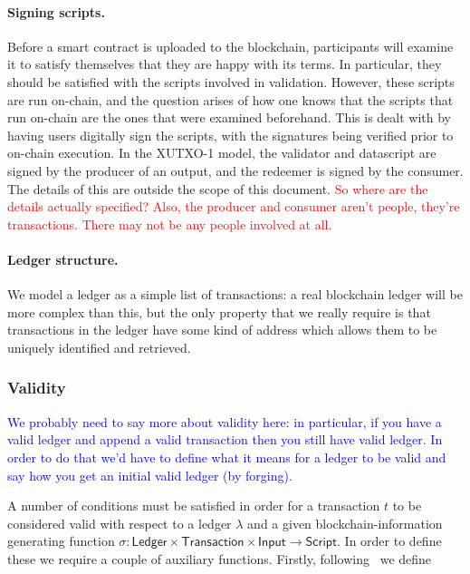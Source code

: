 \documentclass[a4paper]{article}
\newcommand{\red}[1]{\textcolor{red}{#1}}
\newcommand{\blue}[1]{\textcolor{blue}{#1}}
\theoremstyle{definition}  %
\begin{document}
\paragraph{Signing scripts.}  Before a smart contract is uploaded to
the blockchain, participants will examine it to satisfy themselves
that they are happy with its terms.  In particular, they should be
satisfied with the scripts involved in validation.  However, these
scripts are run on-chain, and the question arises of how one knows
that the scripts that run on-chain are the ones that were examined
beforehand.  This is dealt with by having users digitally sign the
scripts, with the signatures being verified prior to on-chain
execution.  In the XUTXO-1 model, the validator and datascript are
signed by the producer of an output, and the redeemer is signed by the
consumer.  The details of this are outside the scope of this document.
\red{So where are the details actually specified? Also, the producer and
  consumer aren't people, they're transactions.  There may not be any
  people involved at all.}

\paragraph{Ledger structure.} We model a ledger as a simple
list of transactions: a real blockchain ledger will be more complex
than this, but the only property that we really require is that
transactions in the ledger have some kind of address which allows them
to be uniquely identified and retrieved.

\subsubsection{Validity}
\label{sec:xutxo-1-validity}
\blue{We probably need to say more about validity here: in particular,
  if you have a valid ledger and append a valid transaction then you
  still have valid ledger.  In order to do that we'd have to define
  what it means for a ledger to be valid and say how you get an initial
  valid ledger (by forging).}

A number of conditions must be satisfied in order for a transaction
$t$ to be considered valid with respect to a ledger $\lambda$ and a
given blockchain-information generating function $\sigma :
\mathsf{Ledger} \times \mathsf{Transaction} \times \mathsf{Input}
\rightarrow \mathsf{Script}$.  In order to define these we require a
couple of auxiliary functions.  Firstly,
following~\cite{Zahnentferner18-UTxO} we define
\end{document}
